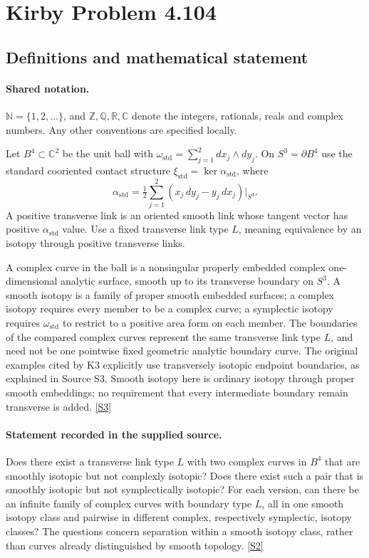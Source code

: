 \documentclass[11pt]{article}
\newcommand{\sref}[2]{\hyperlink{source:#1:#2}{[S#2]}}
\begin{document}
\section{Kirby Problem 4.104}\label{statement}

\subsection{Definitions and mathematical statement}

\paragraph{Shared notation.}$\mathbb N=\{1,2,\ldots\}$, and $\mathbb Z,\mathbb Q,\mathbb R,\mathbb C$ denote the integers, rationals, reals and complex numbers. Any other conventions are specified locally.


Let $B^4\subset\mathbb C^2$ be the unit ball with $\omega_{\mathrm{std}}=\sum_{j=1}^2dx_j\wedge dy_j$. On $S^3=\partial B^4$ use the standard cooriented contact structure $\xi_{\mathrm{std}}=\ker\alpha_{\mathrm{std}}$, where
\[
\alpha_{\mathrm{std}}=\tfrac12\sum_{j=1}^2(x_j\,dy_j-y_j\,dx_j)\big|_{S^3}.
\]
A positive transverse link is an oriented smooth link whose tangent vector has positive $\alpha_{\mathrm{std}}$ value. Use a fixed transverse link type $L$, meaning equivalence by an isotopy through positive transverse links.

A complex curve in the ball is a nonsingular properly embedded complex one-dimensional analytic surface, smooth up to its transverse boundary on $S^3$. A smooth isotopy is a family of proper smooth embedded surfaces; a complex isotopy requires every member to be a complex curve; a symplectic isotopy requires $\omega_{\mathrm{std}}$ to restrict to a positive area form on each member. The boundaries of the compared complex curves represent the same transverse link type $L$, and need not be one pointwise fixed geometric analytic boundary curve. The original examples cited by K3 explicitly use transversely isotopic endpoint boundaries, as explained in Source S3. Smooth isotopy here is ordinary isotopy through proper smooth embeddings; no requirement that every intermediate boundary remain transverse is added. \sref{statement}{3}
\paragraph{Statement recorded in the supplied source.}
Does there exist a transverse link type $L$ with two complex curves in $B^4$ that are smoothly isotopic but not complexly isotopic? Does there exist such a pair that is smoothly isotopic but not symplectically isotopic? For each version, can there be an infinite family of complex curves with boundary type $L$, all in one smooth isotopy class and pairwise in different complex, respectively symplectic, isotopy classes? The questions concern separation within a smooth isotopy class, rather than curves already distinguished by smooth topology. \sref{statement}{2}
\end{document}
